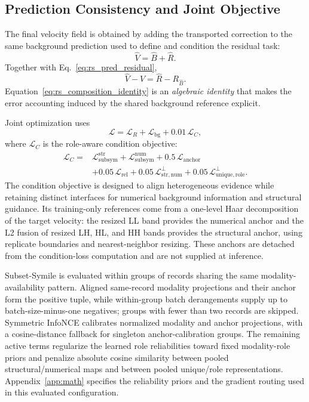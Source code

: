 \subsection{Prediction Consistency and Joint Objective}

The final velocity field is obtained by adding the transported correction to the same background prediction used to define and condition the residual task:
\begin{equation}
\hat V=\hat B+\hat R.
\end{equation}
Together with Eq.~\eqref{eq:rs_pred_residual},
\begin{equation}
\hat V-V=\hat R-R_{\hat B}.
\label{eq:rs_composition_identity}
\end{equation}
Equation~\eqref{eq:rs_composition_identity} is an \emph{algebraic identity} that makes the error accounting induced by the shared background reference explicit.

Joint optimization uses
\begin{equation}
\mathcal L=\mathcal L_R+\mathcal L_{\mathrm{bg}}+0.01\,\mathcal L_C ,
\end{equation}
where $\mathcal L_C$ is the role-aware condition objective:
\begin{equation}
\begin{split}
\mathcal L_C={}&
\mathcal L_{\mathrm{subsym}}^{\mathrm{str}}
+\mathcal L_{\mathrm{subsym}}^{\mathrm{num}}
+0.5\,\mathcal L_{\mathrm{anchor}}\\
&+0.05\,\mathcal L_{\mathrm{rel}}
+0.05\,\mathcal L_{\mathrm{str,num}}^{\perp}
+0.05\,\mathcal L_{\mathrm{unique,role}}^{\perp}.
\end{split}
\label{eq:condition-objective}
\end{equation}
The condition objective is designed to align heterogeneous evidence while retaining distinct interfaces for numerical background information and structural guidance. Its training-only references come from a one-level Haar decomposition of the target velocity: the resized LL band provides the numerical anchor and the L2 fusion of resized LH, HL, and HH bands provides the structural anchor, using replicate boundaries and nearest-neighbor resizing. These anchors are detached from the condition-loss computation and are not supplied at inference.

Subset-Symile is evaluated within groups of records sharing the same modality-availability pattern. Aligned same-record modality projections and their anchor form the positive tuple, while within-group batch derangements supply up to batch-size-minus-one negatives; groups with fewer than two records are skipped. Symmetric InfoNCE calibrates normalized modality and anchor projections, with a cosine-distance fallback for singleton anchor-calibration groups. The remaining active terms regularize the learned role reliabilities toward fixed modality-role priors and penalize absolute cosine similarity between pooled structural/numerical maps and between pooled unique/role representations. Appendix~\ref{app:math} specifies the reliability priors and the gradient routing used in this evaluated configuration.

